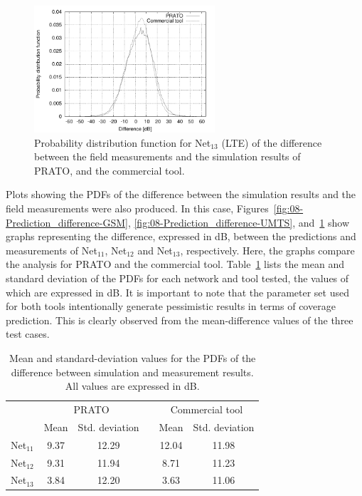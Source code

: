 \begin{figure}[h]
\centering

\includegraphics[width=0.6\textwidth]{08-real_network_planning/img/lte_diff}

\caption{Probability distribution function for Net$_{13}$ (LTE) of the difference
between the field measurements and the simulation results of PRATO,
and the commercial tool.\label{fig:08-Prediction_difference-LTE}}
\end{figure}


Plots showing the PDFs of the difference between the simulation results
and the field measurements were also produced. In this case, Figures~\ref{fig:08-Prediction_difference-GSM},
\ref{fig:08-Prediction_difference-UMTS}, and~\ref{fig:08-Prediction_difference-LTE}
show graphs representing the difference, expressed in dB, between
the predictions and measurements of Net$_{11}$, Net$_{12}$ and Net$_{13}$,
respectively. Here, the graphs compare the analysis for PRATO and
the commercial tool. Table~\ref{tab:08-PDF_properties} lists the
mean and standard deviation of the PDFs for each network and tool
tested, the values of which are expressed in dB. It is important to
note that the parameter set used for both tools intentionally generate
pessimistic results in terms of coverage prediction. This is clearly
observed from the mean-difference values of the three test cases.

\begin{table}
\centering

\caption{Mean and standard-deviation values for the PDFs of the difference
between simulation and measurement results. All values are expressed
in dB.\textit{\emph{ }}\textit{\label{tab:08-PDF_properties}}}


\begin{tabular}{cccccc}
\cmidrule{2-6} 
 & \multicolumn{2}{c}{PRATO} &  & \multicolumn{2}{c}{Commercial tool}\tabularnewline\addlinespace
\cmidrule{2-6} 
 & Mean & Std. deviation &  & Mean & Std. deviation\tabularnewline\addlinespace
\midrule
Net$_{11}$ & 9.37 & 12.29 &  & 12.04 & 11.98\tabularnewline
Net$_{12}$ & 9.31 & 11.94 &  & 8.71 & 11.23\tabularnewline
Net$_{13}$ & 3.84 & 12.20 &  & 3.63 & 11.06\tabularnewline
\bottomrule
\end{tabular}
\end{table}


